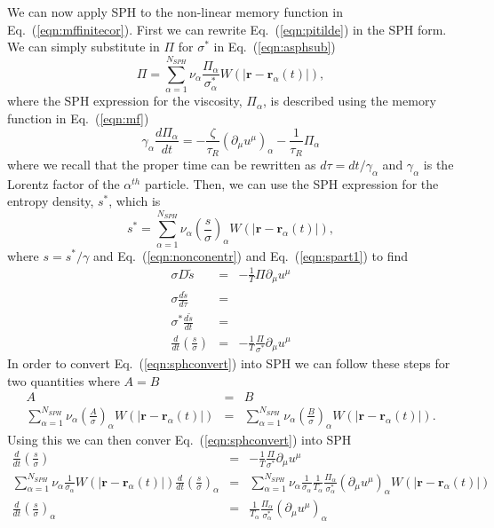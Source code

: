 \documentclass[aps,article]{revtex4}
\begin{document}
We can now apply SPH to the non-linear memory function in Eq.\ (\ref{eqn:mffinitecor}).  First we can rewrite Eq.\ (\ref{eqn:pitilde}) in the SPH form. We can simply substitute in $\Pi$ for $\sigma ^{\ast }$ in Eq.\ (\ref{eqn:asphsub})
\begin{equation}
\Pi =\sum_{\alpha =1}^{N_{SPH}}\nu _{\alpha }\frac{\Pi _{\alpha }}{\sigma
_{\alpha }^{\ast }}W(|\mathbf{r}-\mathbf{r}_{\alpha }(t)|),
\label{Binterpolation}
\end{equation}%
where the SPH expression for the viscosity, $\Pi_{\alpha}$, is described using the memory function in Eq.\ (\ref{eqn:mf})
\begin{equation}
\gamma _{\alpha }\frac{d\Pi _{\alpha }}{dt}=-\frac{\zeta }{\tau _{R}}\left(
\partial _{\mu }u^{\mu }\right) _{\alpha }-\frac{1}{\tau _{R}}\Pi _{\alpha }
\label{BulkSPH}
\end{equation}%
where we recall that the proper time can be rewritten as $d\tau=dt/\gamma_{\alpha}$ and $\gamma_{\alpha}$ is the Lorentz factor of the $\alpha^{th}$ particle.  Then, we can use the SPH expression for the entropy density, $s^{*}$, which is
\begin{equation}
s^{*}=\sum_{\alpha =1}^{N_{SPH}}\nu _{\alpha }\left(\frac{s}{\sigma
}\right)_{\alpha}W(|\mathbf{r}-\mathbf{r}_{\alpha }(t)|),
\end{equation}
where $s=s^*/\gamma$ and Eq.\ (\ref{eqn:nonconentr}) and Eq.\ (\ref{eqn:spart1}) to find
\begin{eqnarray}
\sigma D\tilde{s}&=&-\frac{1}{T}\Pi\partial_{\mu}u^{\mu}\nonumber\\
\sigma \frac{d\tilde{s}}{d\tau}&=&\nonumber\\
\sigma^* \frac{d\tilde{s}}{dt}&=&\nonumber\\
\frac{d}{dt}\left(\frac{s}{\sigma}\right)&=&-\frac{1}{T}\frac{\Pi}{\sigma^* }\partial_{\mu}u^{\mu}\label{eqn:sphconvert}
\end{eqnarray}
In order to convert Eq.\ (\ref{eqn:sphconvert}) into SPH we can follow these steps for two quantities where $A=B$ 
\begin{eqnarray}
A&=&B\nonumber\\
\sum_{\alpha =1}^{N_{SPH}}\nu _{\alpha }\left(\frac{A}{\sigma
}\right)_{\alpha}W(|\mathbf{r}-\mathbf{r}_{\alpha }(t)|)&=&\sum_{\alpha =1}^{N_{SPH}}\nu _{\alpha }\left(\frac{B}{\sigma
}\right)_{\alpha}W(|\mathbf{r}-\mathbf{r}_{\alpha }(t)|).
\end{eqnarray}
Using this we can then conver Eq.\ (\ref{eqn:sphconvert}) into SPH
\begin{eqnarray}
\frac{d}{dt}\left(\frac{s}{\sigma}\right)&=&-\frac{1}{T}\frac{\Pi}{\sigma^* }\partial_{\mu}u^{\mu}\nonumber\\
\sum_{\alpha =1}^{N_{SPH}}\nu _{\alpha }\frac{1}{\sigma_{\alpha}}W(|\mathbf{r}-\mathbf{r}_{\alpha }(t)|)\frac{d}{dt}\left(\frac{s}{\sigma}\right)_{\alpha}&=&\sum_{\alpha =1}^{N_{SPH}}\nu _{\alpha }\frac{1}{\sigma_{\alpha}}\frac{1}{T_{\alpha}}\frac{\Pi_{\alpha}}{\sigma^*_{\alpha} }(\partial_{\mu}u^{\mu})_{\alpha}W(|\mathbf{r}-\mathbf{r}_{\alpha }(t)|)\nonumber\\
\frac{d}{dt}\left(\frac{s}{\sigma}\right)_{\alpha}&=&\frac{1}{T_{\alpha}}\frac{\Pi_{\alpha}}{\sigma^*_{\alpha} }(\partial_{\mu}u^{\mu})_{\alpha}
\end{eqnarray}
\end{document}
